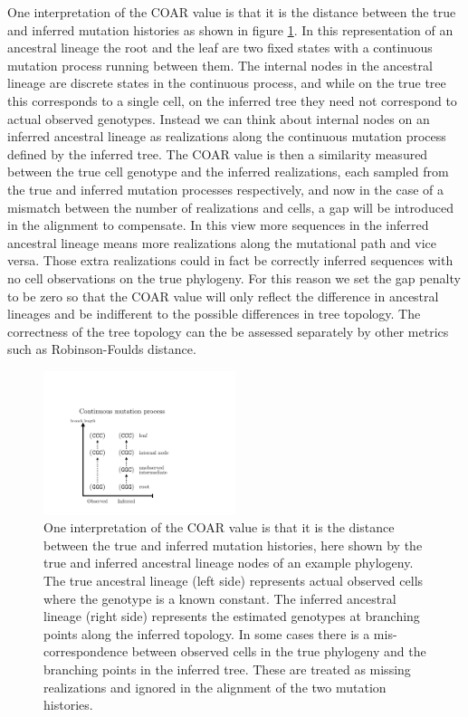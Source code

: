 One interpretation of the COAR value is that it is the distance between the true and inferred mutation histories as shown in figure \ref{fig:mutation_process}.
In this representation of an ancestral lineage the root and the leaf are two fixed states with a continuous mutation process running between them.
The internal nodes in the ancestral lineage are discrete states in the continuous process, and while on the true tree this corresponds to a single cell, on the inferred tree they need not correspond to actual observed genotypes.
Instead we can think about internal nodes on an inferred ancestral lineage as realizations along the continuous mutation process defined by the inferred tree.
The COAR value is then a similarity measured between the true cell genotype and the inferred realizations, each sampled from the true and inferred mutation processes respectively, and now in the case of a mismatch between the number of realizations and cells, a gap will be introduced in the alignment to compensate.
In this view more sequences in the inferred ancestral lineage means more realizations along the mutational path and vice versa.
Those extra realizations could in fact be correctly inferred sequences with no cell observations on the true phylogeny.
For this reason we set the gap penalty to be zero so that the COAR value will only reflect the difference in ancestral lineages and be indifferent to the possible differences in tree topology.
The correctness of the tree topology can the be assessed separately by other metrics such as Robinson-Foulds distance.
\begin{figure}[ht!]
    \centering
    \includegraphics[width=0.5\textwidth]{figures/mutation_process2.pdf}
    \caption{
        \label{fig:mutation_process}
        One interpretation of the COAR value is that it is the distance between the true and inferred mutation histories, here shown by the true and inferred ancestral lineage nodes of an example phylogeny. The true ancestral lineage (left side) represents actual observed cells where the genotype is a known constant. The inferred ancestral lineage (right side) represents the estimated genotypes at branching points along the inferred topology. In some cases there is a mis-correspondence between observed cells in the true phylogeny and the branching points in the inferred tree. These are treated as missing realizations and ignored in the alignment of the two mutation histories.
    }
\end{figure}





